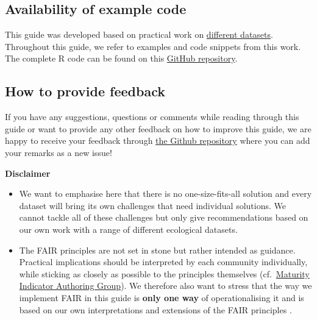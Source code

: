 \documentclass[
  oneside]{book}
\begin{document}
\subsection*{Availability of example code}\label{availability-of-example-code}

This guide was developed based on practical work on \hyperref[example-datasets]{different datasets}. Throughout this guide, we refer to examples and code snippets from this work. The complete R code can be found on this \href{https://github.com/LTER-LIFE/FDFDT}{GitHub repository}.

\subsection*{How to provide feedback}\label{how-to-provide-feedback}

If you have any suggestions, questions or comments while reading through this guide or want to provide any other feedback on how to improve this guide, we are happy to receive your feedback through \href{https://github.com/LTER-LIFE/FDFDT/issues/new}{the Github repository} where you can add your remarks as a new issue!

\begin{disclaimerbox}

{\textbf{Disclaimer}}

\begin{itemize}
\item
  We want to emphasise here that there is no one-size-fits-all solution and every dataset will bring its own challenges that need individual solutions. We cannot tackle all of these challenges but only give recommendations based on our own work with a range of different ecological datasets.
\item
  The FAIR principles are not set in stone but rather intended as guidance. Practical implications should be interpreted by each community individually, while sticking as closely as possible to the principles themselves (cf.~\href{https://fairsharing.github.io/FAIR-Evaluator-FrontEnd/\#!/}{Maturity Indicator Authoring Group}). We therefore also want to stress that the way we implement FAIR in this guide is \textbf{only one way} of operationalising it and is based on our own interpretations and extensions of the FAIR principles \autocite{Wilkinson_2016}.
\end{itemize}

\end{disclaimerbox}
\end{document}
